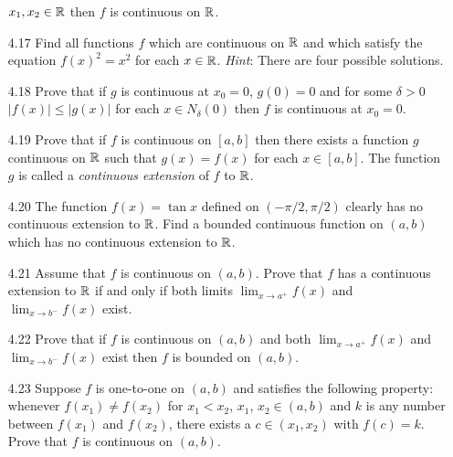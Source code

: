 \begin{enumerate}
               $x_1, x_2 \in \mathbb{R}$ then $f$ is continuous on $\mathbb{R}$.
   \item[4.17] Find all functions $f$ which are continuous on $\mathbb{R}$ and which
               satisfy the equation $f(x)^2 = x^2$ for each $x \in \mathbb{R}$.
               \textit{Hint}: There are four possible solutions.
   \item[4.18] Prove that if $g$ is continuous at $x_0 = 0$, $g(0) = 0$ and for
               some $\delta > 0$ $|f(x)| \le |g(x)|$ for each
               $x \in N_\delta(0)$ then $f$ is continuous at $x_0 = 0$.
   \item[4.19] Prove that if $f$ is continuous on $[a, b]$ then there exists a
               function $g$ continuous on $\mathbb{R}$ such that $g(x) = f(x)$ for each
               $x \in [a, b]$. The function $g$ is called a
               \textit{continuous extension} of $f$ to $\mathbb{R}$.
   \item[4.20] The function $f(x) = \tan x$ defined on $(-\pi/2, \pi/2)$ clearly
               has no continuous extension to $\mathbb{R}$. Find a bounded continuous
               function on $(a, b)$ which has no continuous extension to $\mathbb{R}$.
   \item[4.21] Assume that $f$ is continuous on $(a, b)$. Prove that $f$ has a
               continuous extension to $\mathbb{R}$ if and only if both limits
               $\lim_{x\rightarrow a^+}f(x)$ and $\lim_{x\rightarrow b^-}f(x)$
               exist.
   \item[4.22] Prove that if $f$ is continuous on $(a, b)$ and both
               $\lim_{x\rightarrow a^+}f(x)$ and $\lim_{x\rightarrow b^-}f(x)$
               exist then $f$ is bounded on $(a, b)$.
   \item[4.23] Suppose $f$ is one-to-one on $(a, b)$ and satisfies the following
               property: whenever $f(x_1) \neq f(x_2)$ for $x_1 < x_2$, $x_1$,
               $x_2 \in (a, b)$ and $k$ is any number between $f(x_1)$ and
               $f(x_2)$, there exists a $c \in (x_1, x_2)$ with $f(c) = k$.
               Prove that $f$ is continuous on $(a, b)$.
\end{enumerate}
